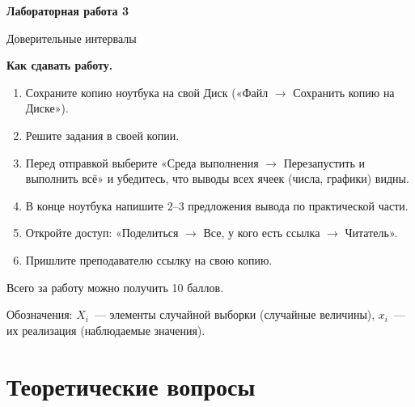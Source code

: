 \documentclass[a4paper,12pt]{article}
\begin{document}
\begin{center}
  {\Large\bfseries Лабораторная работа 3\par}
  {\large Доверительные интервалы\par}
\end{center}

\textbf{Как сдавать работу.}
\begin{enumerate}[itemsep=0.3em]
  \item Сохраните копию ноутбука на свой Диск («Файл $\to$ Сохранить копию на Диске»).
  \item Решите задания в своей копии.
  \item Перед отправкой выберите «Среда выполнения $\to$ Перезапустить и выполнить всё» и убедитесь, что выводы всех ячеек (числа, графики) видны.
  \item В конце ноутбука напишите 2--3 предложения вывода по практической части.
  \item Откройте доступ: «Поделиться $\to$ Все, у кого есть ссылка $\to$ Читатель».
  \item Пришлите преподавателю ссылку на свою копию.
\end{enumerate}

Всего за работу можно получить 10 баллов.

Обозначения: $X_i$~--- элементы случайной выборки (случайные величины), $x_i$~--- их реализация (наблюдаемые значения).

\section*{Теоретические вопросы}
\end{document}
